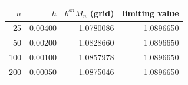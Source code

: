\begin{tabular}{@{}rrrr@{}}
\toprule
$n$ & $h$ & $b^{sn}M_n$ (grid) & limiting value\\
\midrule
25 & 0.00400 & 1.0780086 & 1.0896650\\
50 & 0.00200 & 1.0828660 & 1.0896650\\
100 & 0.00100 & 1.0857978 & 1.0896650\\
200 & 0.00050 & 1.0875046 & 1.0896650\\
\bottomrule
\end{tabular}
